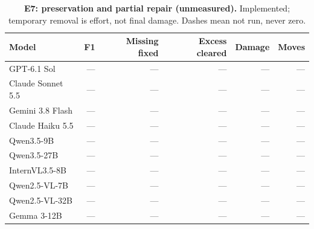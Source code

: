 \begin{table}[!ht]
\centering\small
\caption{\textbf{E7: preservation and partial repair (unmeasured).} Implemented; temporary removal is effort, not final damage. Dashes mean not run, never zero.}
\begin{tabularx}{\textwidth}{@{}Xrrrrr@{}}\toprule
Model & F1 & Missing fixed & Excess cleared & Damage & Moves\\\midrule
GPT-6.1 Sol & --- & --- & --- & --- & ---\\
Claude Sonnet 5.5 & --- & --- & --- & --- & ---\\
Gemini 3.8 Flash & --- & --- & --- & --- & ---\\
Claude Haiku 5.5 & --- & --- & --- & --- & ---\\
Qwen3.5-9B & --- & --- & --- & --- & ---\\
Qwen3.5-27B & --- & --- & --- & --- & ---\\
InternVL3.5-8B & --- & --- & --- & --- & ---\\
Qwen2.5-VL-7B & --- & --- & --- & --- & ---\\
Qwen2.5-VL-32B & --- & --- & --- & --- & ---\\
Gemma 3-12B & --- & --- & --- & --- & ---\\
\bottomrule
\end{tabularx}
\end{table}

